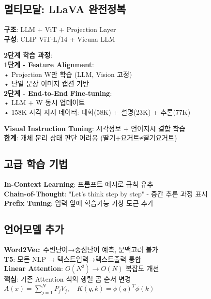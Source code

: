 \documentclass[6pt,landscape,a4paper]{article}
\begin{document}
\begin{multicols}{3}
\subsection{멀티모달: LLaVA 완전정복}
\textbf{구조}: LLM + ViT + Projection Layer\\
\textbf{구성}: CLIP ViT-L/14 + Vicuna LLM

\textbf{2단계 학습 과정}:\\
\textbf{1단계 - Feature Alignment}:\\
• Projection W만 학습 (LLM, Vision 고정)\\
• 단일 문장 이미지 캡션 기반\\
\textbf{2단계 - End-to-End Fine-tuning}:\\
• LLM + W 동시 업데이트\\
• 158K 시각 지시 데이터: 대화(58K) + 설명(23K) + 추론(77K)

\textbf{Visual Instruction Tuning}: 시각정보 + 언어지시 결합 학습\\
\textbf{한계}: 개체 분리 상태 판단 어려움 (딸기+요거트≠딸기요거트)

\subsection{고급 학습 기법}
\textbf{In-Context Learning}: 프롬프트 예시로 규칙 유추\\
\textbf{Chain-of-Thought}: "Let's think step by step" - 중간 추론 과정 표시\\
\textbf{Prefix Tuning}: 입력 앞에 학습가능 가상 토큰 추가

\subsection{언어모델 추가}
\textbf{Word2Vec}: 주변단어→중심단어 예측, 문맥고려 불가\\
\textbf{T5}: 모든 NLP → 텍스트입력→텍스트출력 통합\\
\textbf{Linear Attention}: $O(N^2) \rightarrow O(N)$ 복잡도 개선\\
\textbf{핵심}: 기존 Attention 식의 행렬 곱 순서 변경\\
$A(x) = \sum_{j=1}^N P_j V_j, \quad K(q,k) = \phi(q)^T \phi(k)$

\end{multicols}
\end{document}
